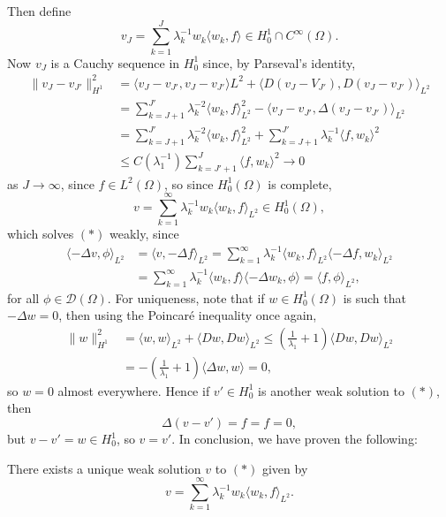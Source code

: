 \documentclass[12pt]{article}
\begin{document}
Then define
\[
v_J = \sum_{k = 1}^J \lambda_k^{-1} w_k \langle w_k, f \rangle \in H^1_0 \cap C^\infty(\Omega).
\]
Now $v_J$ is a Cauchy sequence in $H^1_0$ since, by Parseval's identity,
\begin{align*}
	\|v_J - v_{J'}\|^2_{H^1} &= \langle v_J - v_{J'}, v_J - v_{J'} \rangle L^2 + \langle D(v_J - V_{J'}), D(v_J - v_{J'}) \rangle_{L^2} \\
	&= \sum_{k = J+1}^{J'} \lambda_k^{-2} \langle w_k, f\rangle^2_{L^2} - \langle v_J - v_{J'} , \Delta (v_J - v_{J'}) \rangle_{L^2} \\
	&= \sum_{k = J+1}^{J'} \lambda_k^{-2} \langle w_k, f\rangle^2_{L^2} + \sum_{k = J+1}^{J'} \lambda_k^{-1} \langle f, w_k\rangle^2 \\
	&\leq C(\lambda_1^{-1}) \sum_{k = J' + 1}^{J} \langle f, w_k\rangle^2 \to 0
\end{align*}
as $J \to \infty$, since $f \in L^2(\Omega)$, so since $H^1_0(\Omega)$ is complete,
\[
v = \sum_{k = 1}^\infty \lambda_k^{-1} w_k \langle w_k, f \rangle_{L^2} \in H^1_0(\Omega),
\]
which solves $(\ast)$ weakly, since
\begin{align*}
	\langle - \Delta v, \phi \rangle_{L^2} &= \langle v, - \Delta f \rangle_{L^2} = \sum_{k = 1}^\infty \lambda_k^{-1} \langle w_k, f \rangle_{L^2} \langle - \Delta f, w_k \rangle_{L^2} \\
					       &= \sum_{k = 1}^\infty \lambda_k^{-1} \langle w_k, f \rangle \langle - \Delta w_k, \phi \rangle = \langle f, \phi \rangle_{L^2},
\end{align*}
for all $\phi \in \mathcal{D}(\Omega)$. For uniqueness, note that if $w \in H^1_0(\Omega)$ is such that $- \Delta w = 0$, then using the Poincar\'e inequality once again,
\begin{align*}
	\|w\|^2_{H^1} &= \langle w, w\rangle_{L^2} + \langle Dw, Dw \rangle_{L^2} \leq \left( \frac{1}{\lambda_1} + 1 \right) \langle Dw, Dw \rangle_{L^2} \\
		      &= - \left( \frac{1}{\lambda_1} + 1 \right) \langle \Delta w, w \rangle = 0,
\end{align*}
so $w = 0$ almost everywhere. Hence if $v' \in H^1_0$ is another weak solution to $(\ast)$, then
\[
\Delta(v - v') = f = f = 0,
\]
but $v - v' = w \in H^1_0$, so $v = v'$. In conclusion, we have proven the following:

\begin{theorem}
	There exists a unique weak solution $v$ to $(\ast)$ given by
	\[
	v = \sum_{k = 1}^\infty \lambda_k^{-1} w_k \langle w_k, f \rangle_{L^2}.
	\]
\end{theorem}
\end{document}
